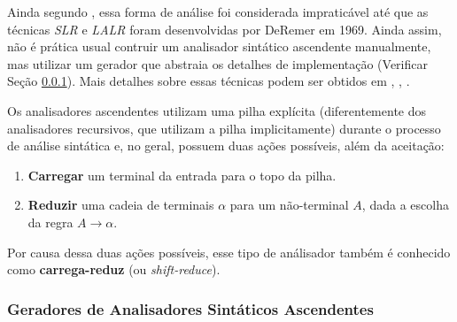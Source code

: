 Ainda segundo , essa forma de análise foi
considerada impraticável até que as técnicas \emph{SLR} e \emph{LALR}
foram desenvolvidas por DeRemer em 1969. Ainda assim, não é prática usual
contruir um analisador sintático ascendente manualmente, mas utilizar um
gerador que abstraia os detalhes de implementação (Verificar Seção
\ref{sec:yacc}). Mais detalhes sobre essas técnicas podem ser obtidos em
, , .

Os analisadores ascendentes utilizam uma pilha explícita (diferentemente dos
analisadores recursivos, que utilizam a pilha implicitamente) durante o processo de
análise sintática e, no geral, possuem duas ações possíveis, além da aceitação:

\begin{enumerate}
	\item \textbf{Carregar} um terminal da entrada para o topo da pilha.
	\item \textbf{Reduzir} uma cadeia de terminais $\alpha$ para um não-terminal
	      $A$, dada a escolha da regra $A \rightarrow \alpha$.
\end{enumerate}

Por causa dessa duas ações possíveis, esse tipo de análisador também é
conhecido como \textbf{carrega-reduz} (ou \emph{shift-reduce}).


\subsubsection{Geradores de Analisadores Sintáticos Ascendentes}
\label{sec:yacc}

